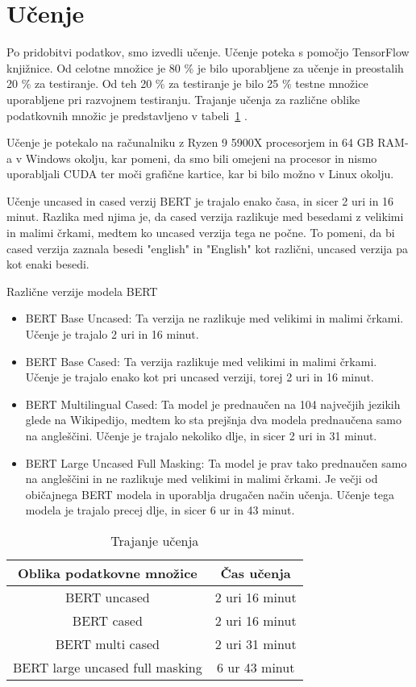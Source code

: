 \documentclass[sigconf,nonacm]{acmart}
\begin{document}
\section{Učenje}
Po pridobitvi podatkov, smo izvedli učenje. Učenje poteka s pomočjo TensorFlow knjižnice. Od celotne množice je 80 \% je bilo uporabljene za učenje in preostalih 20 \% za testiranje. Od teh 20 \% za testiranje je bilo 25 \% testne množice uporabljene pri razvojnem testiranju. Trajanje učenja za različne oblike podatkovnih množic je predstavljeno v tabeli~\ref{tab:table1} . 

Učenje je potekalo na računalniku z Ryzen 9 5900X procesorjem in 64 GB RAM-a v Windows okolju, kar pomeni, da smo bili omejeni na procesor in nismo uporabljali CUDA ter moči grafične kartice, kar bi bilo možno v Linux okolju. 

Učenje uncased in cased verzij BERT je trajalo enako časa, in sicer 2 uri in 16 minut. Razlika med njima je, da cased verzija razlikuje med besedami z velikimi in malimi črkami, medtem ko uncased verzija tega ne počne. To pomeni, da bi cased verzija zaznala besedi "english" in "English" kot različni, uncased verzija pa kot enaki besedi.

Različne verzije modela BERT
\begin{itemize}
\item BERT Base Uncased: Ta verzija ne razlikuje med velikimi in malimi črkami. Učenje je trajalo 2 uri in 16 minut.
\item BERT Base Cased: Ta verzija razlikuje med velikimi in malimi črkami. Učenje je trajalo enako kot pri uncased verziji, torej 2 uri in 16 minut.
\item BERT Multilingual Cased: Ta model je prednaučen na 104 največjih jezikih glede na Wikipedijo, medtem ko sta prejšnja dva modela prednaučena samo na angleščini. Učenje je trajalo nekoliko dlje, in sicer 2 uri in 31 minut.
\item BERT Large Uncased Full Masking: Ta model je prav tako prednaučen samo na angleščini in ne razlikuje med velikimi in malimi črkami. Je večji od običajnega BERT modela in uporablja drugačen način učenja. Učenje tega modela je trajalo precej dlje, in sicer 6 ur in 43 minut.
\end{itemize}

\begin{table}
    \centering
    \caption{Trajanje učenja}
    \label{tab:table1}
    \begin{tabular}{cc}
        	\toprule
        	Oblika podatkovne množice&Čas učenja \\
       	 \midrule
        	BERT uncased & 2 uri 16 minut \\
       	BERT cased &  2 uri 16 minut\\
	BERT multi cased & 2 uri 31 minut \\
	BERT large uncased full masking  &  6 ur 43 minut\\
       	 \bottomrule
    \end{tabular}
\end{table}
\end{document}
